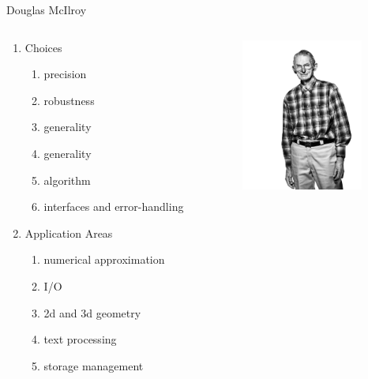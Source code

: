 \documentclass[10pt]{beamer}
\begin{document}
\begin{frame}{Douglas McIlroy}
    \begin{columns}
        \begin{column}{0.6\textwidth}
            \begin{enumerate}
                \item Choices
                    \begin{enumerate}
                        \item precision
                        \item robustness
                        \item generality
                        \item generality
                        \item algorithm
                        \item interfaces and error-handling
                    \end{enumerate}
                \item Application Areas
                \begin{enumerate}
                    \item numerical approximation
                    \item I/O
                    \item 2d and 3d geometry
                    \item text processing
                    \item storage management
                \end{enumerate}
            \end{enumerate}

        \end{column}
        \begin{column}{0.4\textwidth}  %
                \begin{center}
					\includegraphics[height=5cm]{images/doug_mcilroy.jpg}
                \end{center}
        \end{column}
    \end{columns}
\end{frame}
\end{document}
